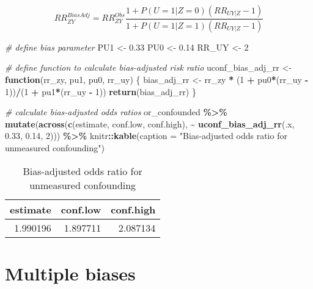 \documentclass[
]{book}
\newenvironment{Shaded}{\begin{snugshade}}{\end{snugshade}}
\newcommand{\AttributeTok}[1]{\textcolor[rgb]{0.13,0.29,0.53}{#1}}
\newcommand{\CommentTok}[1]{\textcolor[rgb]{0.56,0.35,0.01}{\textit{#1}}}
\newcommand{\ControlFlowTok}[1]{\textcolor[rgb]{0.13,0.29,0.53}{\textbf{#1}}}
\newcommand{\DecValTok}[1]{\textcolor[rgb]{0.00,0.00,0.81}{#1}}
\newcommand{\FloatTok}[1]{\textcolor[rgb]{0.00,0.00,0.81}{#1}}
\newcommand{\FunctionTok}[1]{\textcolor[rgb]{0.13,0.29,0.53}{\textbf{#1}}}
\newcommand{\NormalTok}[1]{#1}
\newcommand{\OtherTok}[1]{\textcolor[rgb]{0.56,0.35,0.01}{#1}}
\newcommand{\SpecialCharTok}[1]{\textcolor[rgb]{0.81,0.36,0.00}{\textbf{#1}}}
\newcommand{\StringTok}[1]{\textcolor[rgb]{0.31,0.60,0.02}{#1}}
\begin{document}
\[
RR_{ZY}^{BiasAdj} = RR_{ZY}^{Obs}\frac{1 + P(U=1|Z=0)(RR_{UY|Z}-1)}{1 + P(U=1|Z=1)(RR_{UY|Z}-1)}
\]

\begin{Shaded}
\begin{Highlighting}[]
\CommentTok{\# define bias parameter}
\NormalTok{PU1 }\OtherTok{\textless{}{-}} \FloatTok{0.33}
\NormalTok{PU0 }\OtherTok{\textless{}{-}} \FloatTok{0.14}
\NormalTok{RR\_UY }\OtherTok{\textless{}{-}} \DecValTok{2}

\CommentTok{\# define function to calculate bias{-}adjusted risk ratio}
\NormalTok{uconf\_bias\_adj\_rr }\OtherTok{\textless{}{-}} \ControlFlowTok{function}\NormalTok{(rr\_zy, pu1, pu0, rr\_uy) \{}
\NormalTok{  bias\_adj\_rr }\OtherTok{\textless{}{-}}\NormalTok{ rr\_zy }\SpecialCharTok{*}\NormalTok{ (}\DecValTok{1} \SpecialCharTok{+}\NormalTok{ pu0}\SpecialCharTok{*}\NormalTok{(rr\_uy }\SpecialCharTok{{-}} \DecValTok{1}\NormalTok{))}\SpecialCharTok{/}\NormalTok{(}\DecValTok{1} \SpecialCharTok{+}\NormalTok{ pu1}\SpecialCharTok{*}\NormalTok{(rr\_uy }\SpecialCharTok{{-}} \DecValTok{1}\NormalTok{))}
  \FunctionTok{return}\NormalTok{(bias\_adj\_rr)}
\NormalTok{\}}

\CommentTok{\# calculate bias{-}adjusted odds ratios}
\NormalTok{or\_confounded }\SpecialCharTok{\%\textgreater{}\%} 
  \FunctionTok{mutate}\NormalTok{(}\FunctionTok{across}\NormalTok{(}\FunctionTok{c}\NormalTok{(estimate, conf.low, conf.high), }\SpecialCharTok{\textasciitilde{}} \FunctionTok{uconf\_bias\_adj\_rr}\NormalTok{(.x, }\FloatTok{0.33}\NormalTok{, }\FloatTok{0.14}\NormalTok{, }\DecValTok{2}\NormalTok{))) }\SpecialCharTok{\%\textgreater{}\%}
\NormalTok{  knitr}\SpecialCharTok{::}\FunctionTok{kable}\NormalTok{(}\AttributeTok{caption =} \StringTok{"Bias{-}adjusted odds ratio for unmeasured confounding"}\NormalTok{)}
\end{Highlighting}
\end{Shaded}

\begin{table}

\caption{\label{tab:unnamed-chunk-19}Bias-adjusted odds ratio for unmeasured confounding}
\centering
\begin{tabular}[t]{r|r|r}
\hline
estimate & conf.low & conf.high\\
\hline
1.990196 & 1.897711 & 2.087134\\
\hline
\end{tabular}
\end{table}

\hypertarget{multiple-biases}{%
\section{Multiple biases}\label{multiple-biases}}
\end{document}
